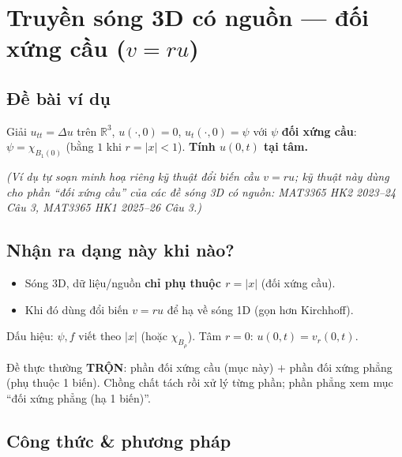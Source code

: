 
\section{Truyền sóng 3D có nguồn --- đối xứng cầu ($v=ru$)}

\subsection*{Đề bài ví dụ}
Giải $u_{tt}=\Delta u$ trên $\mathbb{R}^3$, $u(\cdot,0)=0$, $u_t(\cdot,0)=\psi$ với
$\psi$ \textbf{đối xứng cầu}: $\psi=\chi_{B_1(0)}$ (bằng $1$ khi $r=|x|<1$). \textbf{Tính $u(0,t)$ tại tâm.}

\emph{\small(Ví dụ tự soạn minh hoạ riêng kỹ thuật đổi biến cầu $v=ru$; kỹ thuật này dùng cho phần ``đối xứng cầu'' của các đề sóng 3D có nguồn: MAT3365 HK2 2023--24 Câu 3, MAT3365 HK1 2025--26 Câu 3.)}

\subsection*{Nhận ra dạng này khi nào?}
\begin{itemize}
  \item Sóng 3D, dữ liệu/nguồn \textbf{chỉ phụ thuộc $r=|x|$} (đối xứng cầu).
  \item Khi đó dùng đổi biến $v=ru$ để hạ về sóng 1D (gọn hơn Kirchhoff).
\end{itemize}
\begin{meobox}
Dấu hiệu: $\psi,f$ viết theo $|x|$ (hoặc $\chi_{B_\rho}$). Tâm $r=0$: $u(0,t)=v_r(0,t)$.
\end{meobox}
\begin{luuybox}
Đề thực thường \textbf{TRỘN}: phần đối xứng cầu (mục này) $+$ phần đối xứng phẳng (phụ thuộc 1 biến).
Chồng chất tách rồi xử lý từng phần; phần phẳng xem mục ``đối xứng phẳng (hạ 1 biến)''.
\end{luuybox}

\subsection*{Công thức \& phương pháp}
